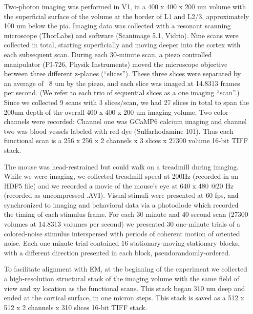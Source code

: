 \documentclass[10pt,letterpaper]{article}
\begin{document}
{

Two-photon imaging was performed in V1, in a 400 x 400 x 200 um volume with the superficial surface of the volume at the border of L1 and L2/3, approximately 100 um below the pia. Imaging data was collected with a resonant scanning microscope (ThorLabs) and software (Scanimage 5.1, Vidrio). Nine scans were collected in total, starting superficially and moving deeper into the cortex with each subsequent scan. During each 30-minute scan, a piezo controlled manipulator (PI-726, Physik Instruments) moved the microscope objective between three different z-planes (“slices”). These three slices were separated by an average of ~8 um  by the piezo, and each slice was imaged at 14.8313 frames per second. (We refer to each trio of sequential slices as a one imaging ``scan”.) Since we collected 9 scans with 3 slices/scan, we had 27 slices in total to span the 200um depth of the overall 400 x 400 x 200 um imaging volume. Two color channels were recorded: Channel one was GCaMP6 calcium imaging and channel two was blood vessels labeled with red dye (Sulfarhodamine 101). Thus each functional scan is a 256 x 256 x 2 channels x 3 slices x 27300 volume 16-bit TIFF stack. 

The mouse was head-restrained but could walk on a treadmill during imaging. While we were imaging, we collected treadmill speed at 200Hz (recorded in an HDF5 file) and we recorded a movie of the mouse’s eye at 640 x 480 @20 Hz (recorded as uncompressed .AVI). Visual stimuli were presented at 60 fps, and synchronized to imaging and behavioral data via a photodiode which recorded the timing of each stimulus frame. For each 30 minute and 40 second scan (27300 volumes at 14.8313 volumes per second) we presented 30 one-minute trials of a colored-noise stimulus \citep{niell_highly_2008} interspersed with periods of coherent motion of oriented noise. Each one minute trial contained 16 stationary-moving-stationary blocks, with a different direction presented in each block, pseudorandomly-ordered. 

To facilitate alignment with EM, at the beginning of the experiment we collected a high-resolution structural stack of the imaging volume with the same field of view and xy location as the functional scans. This stack began 310 um deep and ended at the cortical surface, in one micron steps. This stack is saved as a 512 x 512 x 2 channels x 310 slices 16-bit TIFF stack. 


}
\end{document}
